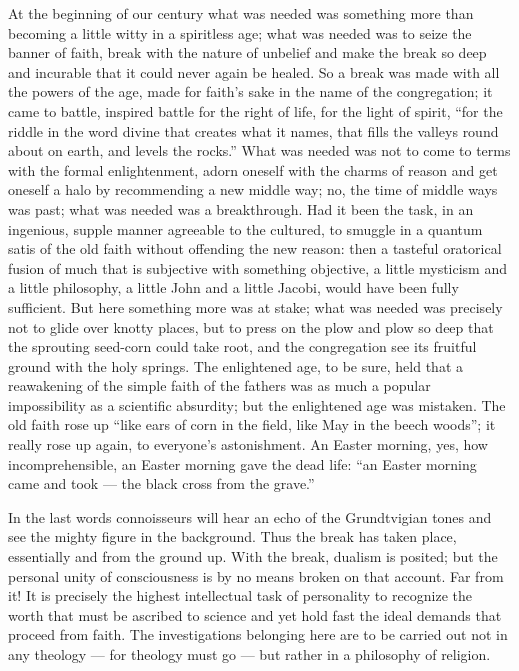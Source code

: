 \documentclass[12pt]{book}
\newcommand{\opage}[1]{\marginnote{\footnotesize\textit{[#1]}}}
\begin{document}
At the beginning of our century what was needed was something more than
becoming a little witty in a spiritless age; what was needed was to seize the
banner of faith, break with the nature of unbelief and make the break so deep
and incurable that it could never again be healed. So a break was made with
all the powers of the age, made for faith's sake in the name of the
congregation; it came to battle, inspired battle for the right of life, for
the light of spirit, ``for the riddle in the word divine that creates what it
names, that fills the valleys round about on
earth, and levels the rocks.'' What was needed was not to come to terms with
the formal enlightenment, adorn oneself with the charms of reason and get
oneself a halo by recommending a new middle way; no, the time of middle ways
was past; what was needed was a breakthrough. Had it been the task, in an
ingenious, supple manner agreeable to the cultured, to smuggle in a quantum
satis of the
\opage{253}\setcounter{footnote}{0}%
old faith without offending the new reason: then a tasteful oratorical fusion
of much that is subjective with something objective, a little mysticism and a
little philosophy, a little John and a little Jacobi, would have been fully
sufficient. But here something more was at stake; what was needed was
precisely not to glide over knotty places, but to press on the plow and plow
so deep that the sprouting seed-corn could take root, and the congregation
see its fruitful ground with the holy springs. The enlightened age, to be
sure, held that a reawakening of the simple faith of the fathers was as much
a popular impossibility as a scientific absurdity; but the enlightened age was
mistaken. The old faith rose up ``like ears of corn in the field, like May in
the beech woods''; it really rose up again, to everyone's astonishment. An
Easter morning, yes, how incomprehensible, an Easter morning gave the dead
life: ``an Easter morning came and took --- the black cross from the grave.''

In the last words connoisseurs will hear an echo of the Grundtvigian tones and
see the mighty figure in the background. Thus the break has taken place,
essentially and from the ground up. With the break, dualism is posited; but
the personal unity of consciousness is by no means broken on that account. Far
from it! It is precisely the highest intellectual task of personality to
recognize the worth that must be ascribed to science and yet hold fast the
ideal demands that proceed from faith. The investigations belonging here are
to be carried out not in any theology --- for theology must go --- but rather
in a philosophy of religion.
\end{document}
